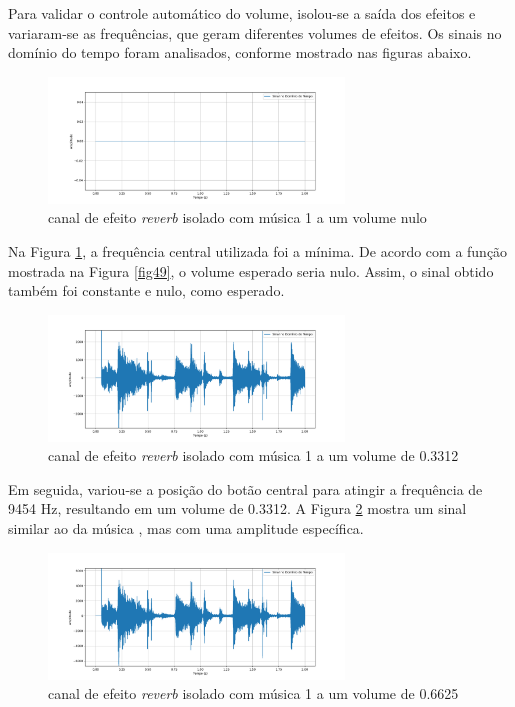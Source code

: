 Para validar o controle automático do volume, isolou-se a saída dos efeitos e variaram-se as frequências, que geram diferentes volumes de efeitos. Os sinais no domínio do tempo foram analisados, conforme mostrado nas figuras abaixo.

\begin{figure}[h]
    \centering
    \includegraphics[width=0.7\textwidth]{figuras/fig66.png}
    \caption{canal de efeito \textit{reverb} isolado com música 1 a um volume nulo}
    \label{fig66}
\end{figure}

Na Figura \ref{fig66}, a frequência central utilizada foi a mínima. De acordo com a função mostrada na Figura \ref{fig49}, o volume esperado seria nulo. Assim, o sinal obtido também foi constante e nulo, como esperado.

\begin{figure}[h]
    \centering
    \includegraphics[width=0.7\textwidth]{figuras/fig67.png}
    \caption{canal de efeito \textit{reverb} isolado com música 1 a um volume de 0.3312}
    \label{fig67}
\end{figure}

Em seguida, variou-se a posição do botão central para atingir a frequência de 9454 Hz, resultando em um volume de 0.3312. A Figura \ref{fig67} mostra um sinal similar ao da música \cite{track01}, mas com uma amplitude específica.

\newpage

\begin{figure}[h]
    \centering
    \includegraphics[width=0.7\textwidth]{figuras/fig68.png}
    \caption{canal de efeito \textit{reverb} isolado com música 1 a um volume de 0.6625}
    \label{fig68}
\end{figure}

